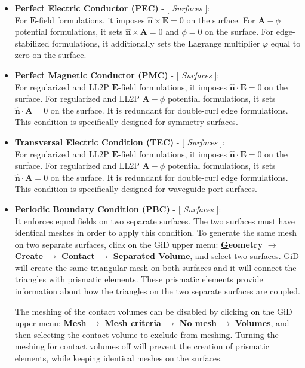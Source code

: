 \begin{itemize}\itemsep0em\label{DirichletBCExp} 
	\item \textbf{Perfect Electric Conductor (PEC)} - [ \textit{Surfaces} ]:\\ 
	For $\mathbf{E}$-field formulations, it imposes $\mathbf{\hat{n}}\times\mathbf{E} = 0$ on the surface. For $\mathbf{A}-\phi$ potential formulations, it sets $\mathbf{\hat{n}}\times\mathbf{A} = 0$ and $\phi = 0$ on the surface. For edge-stabilized formulations, it additionally sets the Lagrange multiplier $\varphi$ equal to zero on the surface.
	\\
	\item \textbf{Perfect Magnetic Conductor (PMC)} - [ \textit{Surfaces} ]:\\ 
	For regularized and LL2P $\mathbf{E}$-field formulations, it imposes $\mathbf{\hat{n}}\cdot\mathbf{E} = 0$ on the surface. For regularized and LL2P $\mathbf{A}-\phi$ potential formulations, it sets $\mathbf{\hat{n}}\cdot\mathbf{A} = 0$ on the surface. It is redundant for double-curl edge formulations. This condition is specifically designed for symmetry surfaces.
	\\
	\item \textbf{Transversal Electric Condition (TEC)} - [ \textit{Surfaces} ]:\\ 
	For regularized and LL2P $\mathbf{E}$-field formulations, it imposes $\mathbf{\hat{n}}\cdot\mathbf{E} = 0$ on the surface. For regularized and LL2P $\mathbf{A}-\phi$ potential formulations, it sets $\mathbf{\hat{n}}\cdot\mathbf{A} = 0$ on the surface. It is redundant for double-curl edge formulations. This condition is specifically designed for waveguide port surfaces. 
	\\
	\item \textbf{Periodic Boundary Condition (PBC)} - [ \textit{Surfaces} ]:\\ 
    It enforces equal fields on two separate surfaces. The two surfaces must have identical meshes in order to apply this condition. To generate the same mesh on two separate surfaces, click on the GiD upper menu: \textbf{\underline{G}eometry} $\rightarrow$ \textbf{Create} $\rightarrow$ \textbf{Contact} $\rightarrow$ \textbf{Separated Volume}, and select two surfaces. GiD will create the same triangular mesh on both surfaces and it will connect the triangles with prismatic elements. These prismatic elements provide information about how the triangles on the two separate surfaces are coupled. 
    
    The meshing of the contact volumes can be disabled by clicking on the GiD upper menu: \textbf{\underline{M}esh} $\rightarrow$ \textbf{Mesh criteria} $\rightarrow$ \textbf{No mesh} $\rightarrow$ \textbf{Volumes}, and then selecting the contact volume to exclude from meshing. Turning the meshing for contact volumes off will prevent the creation of prismatic elements, while keeping identical meshes on the surfaces. 
    

\end{itemize}

